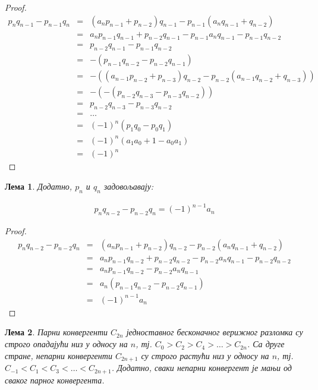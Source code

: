 \documentclass[a4paper]{article}
\newtheorem{lemma}{Лема}
\begin{document}
\begin{proof}
	\begin{eqnarray*}
		p_{n}q_{n-1} - p_{n-1}q_{n} &=& (a_{n}p_{n-1} + p_{n-2})q_{n-1} - p_{n-1}(a_{n}q_{n-1} + q_{n-2})\\
									&=& a_{n}p_{n-1}q_{n-1} + p_{n-2}q_{n-1} - p_{n-1}a_{n}q_{n-1} - p_{n-1}q_{n-2}\\
									&=& p_{n-2}q_{n-1} - p_{n-1}q_{n-2}\\
									&=& -(p_{n-1}q_{n-2} - p_{n-2}q_{n-1})\\
									&=& -((a_{n-1}p_{n-2} + p_{n-3})q_{n-2} - p_{n-2}(a_{n-1}q_{n-2} + q_{n-3}))\\
									&=& -(-(p_{n-2}q_{n-3} - p_{n-3}q_{n-2}))\\
									&=& p_{n-2}q_{n-3} - p_{n-3}q_{n-2}\\
									&=& \ldots\\
									&=& (-1)^{n}(p_{1}q_{0} - p_{0}q_{1})\\
									&=& (-1)^{n}(a_{1}a_{0} + 1 - a_{0}a_{1})\\
									&=& (-1)^{n}
	\end{eqnarray*}
\end{proof}

\begin{lemma}
	Додатно, $ p_{n} $ и $ q_{n} $ задовољавају:
	
	\begin{eqnarray}
	\label{c.f_svojstvo_2} p_{n}q_{n-2} - p_{n-2}q_{n} = (-1)^{n-1}a_{n}
	\end{eqnarray}	
\end{lemma}

\begin{proof}
	\begin{eqnarray*}
		p_{n}q_{n-2} - p_{n-2}q_{n} &=& (a_{n}p_{n-1} + p_{n-2})q_{n-2} - p_{n-2}(a_{n}q_{n-1} + q_{n-2})\\
		&=& a_{n}p_{n-1}q_{n-2} + p_{n-2}q_{n-2} - p_{n-2}a_{n}q_{n-1} - p_{n-2}q_{n-2}\\
		&=& a_{n}p_{n-1}q_{n-2} - p_{n-2}a_{n}q_{n-1}\\
		&=& a_{n}(p_{n-1}q_{n-2} - p_{n-2}q_{n-1})\\
		&=& (-1)^{n-1}a_{n}
	\end{eqnarray*}
\end{proof}

\begin{lemma}
	\label{lemma:svojstva_konvergenata}
	Парни конвергенти $ C_{2n} $ једноставног бесконачног верижног разломка су строго опадајући низ у односу на $ n $, тј. $ C_{0} > C_{2} > C_{4} > \ldots > C_{2n} $. Са друге стране, непарни конвергенти $ C_{2n+1} $ су строго растући низ у односу на $ n $, тј. $ C_{-1} < C_{1} < C_{3} < \ldots < C_{2n+1} $. Додатно, сваки непарни конвергент је мањи од сваког парног конвергента.
\end{lemma}
\end{document}
